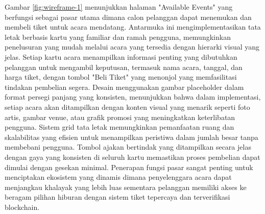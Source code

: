 Gambar \ref{fig:wireframe-1} menunjukkan halaman "Available Events" yang
berfungsi sebagai pasar utama dimana calon pelanggan dapat menemukan dan
membeli tiket untuk acara mendatang. Antarmuka ini mengimplementasikan tata
letak berbasis kartu yang familiar dan ramah pengguna, memungkinkan penelusuran
yang mudah melalui acara yang tersedia dengan hierarki visual yang jelas.
Setiap kartu acara menampilkan informasi penting yang dibutuhkan pelanggan
untuk mengambil keputusan, termasuk nama acara, tanggal, dan harga tiket,
dengan tombol "Beli Tiket" yang menonjol yang memfasilitasi tindakan pembelian
segera. Desain menggunakan gambar placeholder dalam format persegi panjang yang
konsisten, menunjukkan bahwa dalam implementasi, setiap acara akan ditampilkan
dengan konten visual yang menarik seperti foto artis, gambar venue, atau grafik
promosi yang meningkatkan keterlibatan pengguna. Sistem grid tata letak
memungkinkan pemanfaatan ruang dan skalabilitas yang efisien untuk menampilkan
peristiwa dalam jumlah besar tanpa membebani pengguna. Tombol ajakan bertindak
yang ditampilkan secara jelas dengan gaya yang konsisten di seluruh kartu
memastikan proses pembelian dapat dimulai dengan gesekan minimal. Penerapan
fungsi pasar sangat penting untuk menciptakan ekosistem yang dinamis dimana
penyelenggara acara dapat menjangkau khalayak yang lebih luas sementara
pelanggan memiliki akses ke beragam pilihan hiburan dengan sistem tiket
tepercaya dan terverifikasi blockchain.


